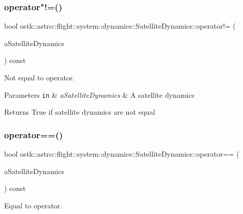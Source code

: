 \subsubsection{\texorpdfstring{operator"!=()}{operator!=()}}
{\footnotesize\ttfamily bool ostk\+::astro\+::flight\+::system\+::dynamics\+::\+Satellite\+Dynamics\+::operator!= (\begin{DoxyParamCaption}\item[{const \hyperlink{classostk_1_1astro_1_1flight_1_1system_1_1dynamics_1_1_satellite_dynamics}{Satellite\+Dynamics} \&}]{a\+Satellite\+Dynamics }\end{DoxyParamCaption}) const}



Not equal to operator. 


\begin{DoxyParams}[1]{Parameters}
\mbox{\tt in}  & {\em a\+Satellite\+Dynamics} & A satellite dynamics \\
\hline
\end{DoxyParams}
\begin{DoxyReturn}{Returns}
True if satellite dynamics are not equal 
\end{DoxyReturn}
\mbox{\label{classostk_1_1astro_1_1flight_1_1system_1_1dynamics_1_1_satellite_dynamics_a911f594991ee3b3a9187a34904118fc6}} 
\subsubsection{\texorpdfstring{operator==()}{operator==()}}
{\footnotesize\ttfamily bool ostk\+::astro\+::flight\+::system\+::dynamics\+::\+Satellite\+Dynamics\+::operator== (\begin{DoxyParamCaption}\item[{const \hyperlink{classostk_1_1astro_1_1flight_1_1system_1_1dynamics_1_1_satellite_dynamics}{Satellite\+Dynamics} \&}]{a\+Satellite\+Dynamics }\end{DoxyParamCaption}) const}



Equal to operator. 


